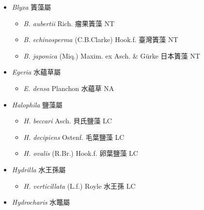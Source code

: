 
  \begin{itemize}
 \item[] \textit{Blyxa} 簀藻屬
                                
  \begin{itemize}
        \item[] \textit{B. aubertii} Rich.  瘤果簀藻   NT
        \item[] \textit{B. echinosperma} (C.B.Clarke) Hook.f.  臺灣簀藻   NT
        \item[] \textit{B. japonica} (Miq.) Maxim. ex Asch. \& Gürke  日本簀藻   NT
  \end{itemize}
 \item[] \textit{Egeria} 水蘊草屬
                                
  \begin{itemize}
        \item[] \textit{E. densa} Planchon  水蘊草   NA
  \end{itemize}
 \item[] \textit{Halophila} 鹽藻屬
                                
  \begin{itemize}
        \item[] \textit{H. beccari} Asch.  貝氏鹽藻   LC
        \item[] \textit{H. decipiens} Ostenf.  毛葉鹽藻   LC
        \item[] \textit{H. ovalis} (R.Br.) Hook.f.  卵葉鹽藻   LC
  \end{itemize}
 \item[] \textit{Hydrilla} 水王孫屬
                                
  \begin{itemize}
        \item[] \textit{H. verticillata} (L.f.) Royle  水王孫   LC
  \end{itemize}
 \item[] \textit{Hydrocharis} 水鼈屬
                                

\end{itemize}
